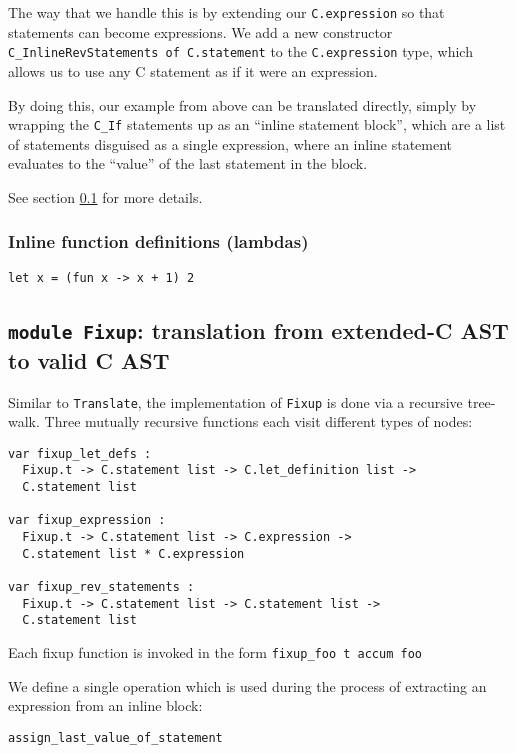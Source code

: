 \documentclass[12pt,a4paper,twoside,openright]{report}
\begin{document}
The way that we handle this is by extending our \lstinline!C.expression! so
that statements can become expressions.  We add a new constructor
\lstinline!C_InlineRevStatements of C.statement! to the
\lstinline!C.expression! type, which allows us to use any C statement as if it
were an expression.

By doing this, our example from above can be translated directly, simply by
wrapping the \lstinline!C_If! statements up as an ``inline statement block'',
which are a list of statements disguised as a single expression, where an
inline statement evaluates to the ``value'' of the last statement in the block.

See section \ref{module-fixup} for more details.


\subsubsection{Inline function definitions (lambdas)}\label{c-inline-functions}

\begin{lstlisting}
let x = (fun x -> x + 1) 2
\end{lstlisting}

\subsection{\texttt{module Fixup}: translation from extended-C AST to valid C AST}\label{module-fixup}

Similar to \lstinline!Translate!, the implementation of \lstinline!Fixup! is
done via a recursive tree-walk. Three mutually recursive functions each visit
different types of nodes:

\begin{lstlisting}
var fixup_let_defs :
  Fixup.t -> C.statement list -> C.let_definition list ->
  C.statement list

var fixup_expression :
  Fixup.t -> C.statement list -> C.expression ->
  C.statement list * C.expression

var fixup_rev_statements :
  Fixup.t -> C.statement list -> C.statement list ->
  C.statement list
\end{lstlisting}

Each fixup function is invoked in the form \lstinline!fixup_foo t accum foo!

We define a single operation which is used during the process of extracting an
expression from an inline block:

\begin{lstlisting}
assign_last_value_of_statement
\end{lstlisting}
\end{document}
